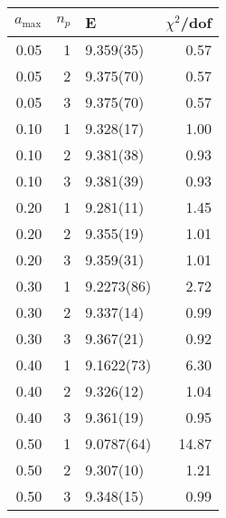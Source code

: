 \begin{tabular}{rrlr}
\hline
   $a_\textrm{max}$ &   $n_p$ & E          &   $\chi^2$/dof \\
\hline
               0.05 &       1 & 9.359(35)  &           0.57 \\
               0.05 &       2 & 9.375(70)  &           0.57 \\
               0.05 &       3 & 9.375(70)  &           0.57 \\
               0.10 &       1 & 9.328(17)  &           1.00 \\
               0.10 &       2 & 9.381(38)  &           0.93 \\
               0.10 &       3 & 9.381(39)  &           0.93 \\
               0.20 &       1 & 9.281(11)  &           1.45 \\
               0.20 &       2 & 9.355(19)  &           1.01 \\
               0.20 &       3 & 9.359(31)  &           1.01 \\
               0.30 &       1 & 9.2273(86) &           2.72 \\
               0.30 &       2 & 9.337(14)  &           0.99 \\
               0.30 &       3 & 9.367(21)  &           0.92 \\
               0.40 &       1 & 9.1622(73) &           6.30 \\
               0.40 &       2 & 9.326(12)  &           1.04 \\
               0.40 &       3 & 9.361(19)  &           0.95 \\
               0.50 &       1 & 9.0787(64) &          14.87 \\
               0.50 &       2 & 9.307(10)  &           1.21 \\
               0.50 &       3 & 9.348(15)  &           0.99 \\
\hline
\end{tabular}

